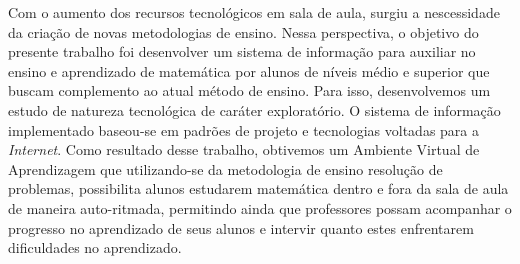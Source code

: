 Com o aumento dos recursos tecnológicos em sala de aula, surgiu a nescessidade da criação de novas metodologias de ensino. Nessa perspectiva, o objetivo do presente trabalho foi desenvolver um sistema de informação para auxiliar no ensino e aprendizado de matemática por alunos de níveis médio e superior que buscam complemento ao atual método de ensino. Para isso, desenvolvemos um estudo de natureza tecnológica de caráter exploratório. O sistema de informação implementado baseou-se em padrões de projeto e tecnologias voltadas para a \textit{Internet}. Como resultado desse trabalho, obtivemos um Ambiente Virtual de Aprendizagem que utilizando-se da metodologia de ensino resolução de problemas, possibilita alunos estudarem matemática dentro e fora da sala de aula de maneira auto-ritmada, permitindo ainda que professores possam acompanhar o progresso no aprendizado de seus alunos e intervir quanto estes enfrentarem dificuldades no aprendizado.   


